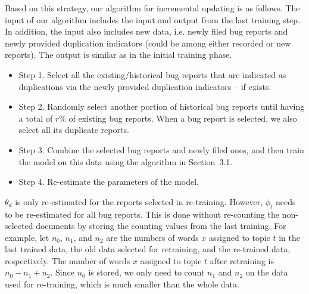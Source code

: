 

Based on this strategy, our algorithm for incremental updating is as
follows. The input of our algorithm includes the input and output from
the last training step. In addition, the input also includes new data,
i.e. newly filed bug reports and newly provided duplication
indicators (could be among either recorded or new reports). The output
is similar as in the initial training phase.

\begin{itemize}

\item Step 1. Select all the existing/historical bug reports that are
indicated as duplications via the newly provided duplication indicators --
if exists.

\item Step 2. Randomly select another portion of historical bug reports
until having a total of $r\%$ of existing bug reports. When a bug report
is selected, we also select all its duplicate reports.

\item Step 3. Combine the selected bug reports and newly filed ones, and then
train the model on this data using the algorithm in Section~3.1.

\item Step 4. Re-estimate the parameters of the model.

\end{itemize}

$\theta_d$ is only re-estimated for the reports selected in
re-training. However, $\phi_t$ needs to be re-estimated for all bug
reports. This is done without re-counting the non-selected documents
by storing the counting values from the last training. For example,
let $n_0$, $n_1$, and $n_2$ are the numbers of words $x$ assigned to
topic $t$ in the last trained data, the old data selected for
retraining, and the re-trained data, respectively. The number of words
$x$ assigned to topic $t$ after retraining is $n_0 - n_1 + n_2$. Since
$n_0$ is stored, we only need to count $n_1$ and $n_2$ on the data
used for re-training, which is much smaller than the whole data.
